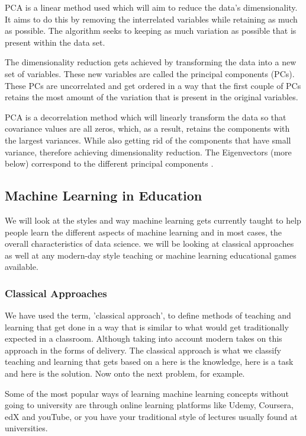 		PCA is a linear method used which will aim to reduce the data's dimensionality. It aims to do this by removing the interrelated variables while retaining as much as possible. The algorithm seeks to keeping as much variation as possible that is present within the data set.
		
		The dimensionality reduction gets achieved by transforming the data into a new set of variables. These new variables are called the principal components (PCs). These PCs are uncorrelated and get ordered in a way that the first couple of PCs retains the most amount of the variation that is present in the original variables.
		
		PCA is a decorrelation method which will linearly transform the data so that covariance values are all zeros, which, as a result, retains the components with the largest variances. While also getting rid of the components that have small variance, therefore achieving dimensionality reduction. The Eigenvectors (more below) correspond to the different principal components \cite{jason_lectures_PCA}. 
	
	\subsection{Machine Learning in Education}
		\label{seb_sec:ml_in_learning}
	
	We will look at the styles and way machine learning gets currently taught to help people learn the different aspects of machine learning and in most cases, the overall characteristics of data science. we will be looking at classical approaches as well at any modern-day style teaching or machine learning educational games available. 
	
	\subsubsection{Classical Approaches}
		\label{sub_sec:classical_teach_learn}
		
		We have used the term, 'classical approach', to define methods of teaching and learning that get done in a way that is similar to what would get traditionally expected in a classroom.  Although taking into account modern takes on this approach in the forms of delivery. The classical approach is what we classify teaching and learning that gets based on a here is the knowledge, here is a task and here is the solution. Now onto the next problem, for example.
		
		Some of the most popular ways of learning machine learning concepts without going to university are through online learning platforms like Udemy, Coursera, edX and youTube, or you have your traditional style of lectures usually found at universities.
		
